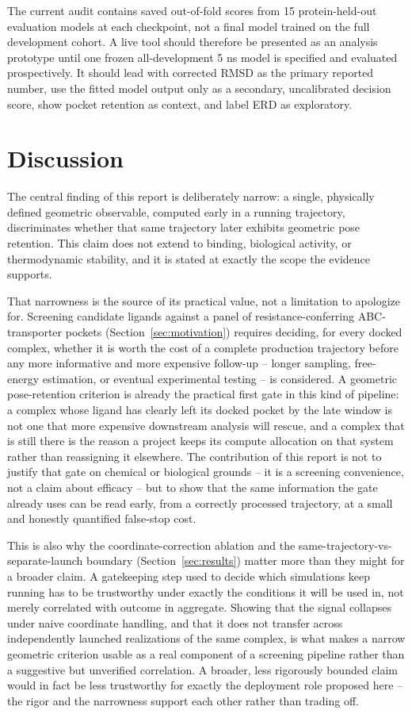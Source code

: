 \documentclass[11pt]{article}
\begin{document}
The current audit contains saved out-of-fold scores from 15 protein-held-out evaluation models at each checkpoint, not a final model trained on the full development cohort. A live tool should therefore be presented as an analysis prototype until one frozen all-development 5 ns model is specified and evaluated prospectively. It should lead with corrected RMSD as the primary reported number, use the fitted model output only as a secondary, uncalibrated decision score, show pocket retention as context, and label ERD as exploratory.

\section{Discussion}

The central finding of this report is deliberately narrow: a single, physically defined geometric observable, computed early in a running trajectory, discriminates whether that same trajectory later exhibits geometric pose retention. This claim does not extend to binding, biological activity, or thermodynamic stability, and it is stated at exactly the scope the evidence supports.

That narrowness is the source of its practical value, not a limitation to apologize for. Screening candidate ligands against a panel of resistance-conferring ABC-transporter pockets (Section~\ref{sec:motivation}) requires deciding, for every docked complex, whether it is worth the cost of a complete production trajectory before any more informative and more expensive follow-up -- longer sampling, free-energy estimation, or eventual experimental testing -- is considered. A geometric pose-retention criterion is already the practical first gate in this kind of pipeline: a complex whose ligand has clearly left its docked pocket by the late window is not one that more expensive downstream analysis will rescue, and a complex that is still there is the reason a project keeps its compute allocation on that system rather than reassigning it elsewhere. The contribution of this report is not to justify that gate on chemical or biological grounds -- it is a screening convenience, not a claim about efficacy -- but to show that the same information the gate already uses can be read early, from a correctly processed trajectory, at a small and honestly quantified false-stop cost.

This is also why the coordinate-correction ablation and the same-trajectory-vs-separate-launch boundary (Section~\ref{sec:results}) matter more than they might for a broader claim. A gatekeeping step used to decide which simulations keep running has to be trustworthy under exactly the conditions it will be used in, not merely correlated with outcome in aggregate. Showing that the signal collapses under naive coordinate handling, and that it does not transfer across independently launched realizations of the same complex, is what makes a narrow geometric criterion usable as a real component of a screening pipeline rather than a suggestive but unverified correlation. A broader, less rigorously bounded claim would in fact be less trustworthy for exactly the deployment role proposed here -- the rigor and the narrowness support each other rather than trading off.
\end{document}
